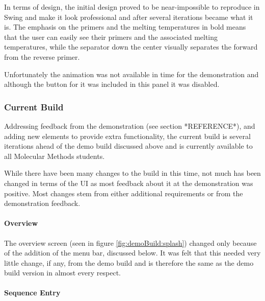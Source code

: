 In terms of design, the initial design proved to be near-impossible to
reproduce in Swing and make it look professional and after several
iterations became what it is.
The emphasis on the primers and the melting temperatures in bold means
that the user can easily see their primers and the associated melting
temperatures, while the separator down the center visually separates
the forward from the reverse primer.

Unfortunately the animation was not available in time for the
demonstration and although the button for it was included in this
panel it was disabled.


\subsubsection{Current Build}

Addressing feedback from the demonstration (see section *REFERENCE*),
and adding new elements to provide extra functionality, the current
build is several iterations ahead of the demo build discussed above
and is currently available to all Molecular Methods students.

While there have been many changes to the build in this time, not much
has been changed in terms of the UI as most feedback about it at the
demonstration was positive.
Most changes stem from either additional requirements or from the
demonstration feedback.

\paragraph{Overview}
The overview screen (seen in figure \ref{fig:demoBuild:splash})
changed only because of the addition of the menu bar, discussed
below.
It was felt that this needed very little change, if any, from the demo
build and is therefore the same as the demo build version in almost
every respect.

\paragraph{Sequence Entry}

